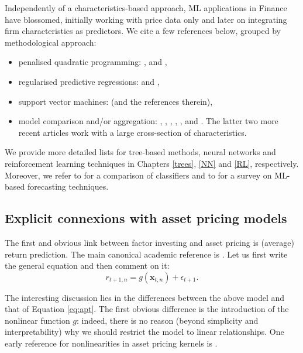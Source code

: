 \documentclass[]{krantz}
\providecommand{\tightlist}{%
  \setlength{\itemsep}{0pt}\setlength{\parskip}{0pt}}
\theoremstyle{definition}
\theoremstyle{definition}
\theoremstyle{definition}
\theoremstyle{remark}
\begin{document}
Independently of a characteristics-based approach, ML applications in
Finance have blossomed, initially working with price data only and later
on integrating firm characteristics as predictors. We cite a few
references below, grouped by methodological approach:

\begin{itemize}
\tightlist
\item
  penalised quadratic programming: \citet{goto2015improving},
  \citet{ban2016machine} and \citet{perrin2019machine},
\item
  regularised predictive regressions: \citet{rapach2013international}
  and \citet{chinco2019sparse},
\item
  support vector machines: \citet{cao2003support} (and the references
  therein),
\item
  model comparison and/or aggregation: \citet{kim2003financial},
  \citet{huang2005forecasting}, \citet{matias2012forecasting},
  \citet{reboredo2012nonlinearity}, \citet{dunis2013hybrid},
  \citet{gu2018empirical} and \citet{guida2018machine}. The latter two
  more recent articles work with a large cross-section of
  characteristics.
\end{itemize}

We provide more detailed lists for tree-based methods, neural networks
and reinforcement learning techniques in Chapters \ref{trees}, \ref{NN}
and \ref{RL}, respectively. Moreover, we refer to
\citet{ballings2015evaluating} for a comparison of classifiers and to
\citet{henrique2019literature} for a survey on ML-based forecasting
techniques.

\hypertarget{explicit-connexions-with-asset-pricing-models}{%
\subsection{Explicit connexions with asset pricing
models}\label{explicit-connexions-with-asset-pricing-models}}

The first and obvious link between factor investing and asset pricing is
(average) return prediction. The main canonical academic reference is
\citet{gu2018empirical}. Let us first write the general equation and
then comment on it: \begin{equation}
\label{eq:genML}
r_{t+1,n}=g(\textbf{x}_{t,n}) + \epsilon_{t+1}.
\end{equation}

The interesting discussion lies in the differences between the above
model and that of Equation \eqref{eq:apt}. The first obvious difference is
the introduction of the nonlinear function \(g\): indeed, there is no
reason (beyond simplicity and interpretability) why we should restrict
the model to linear relationships. One early reference for
nonlinearities in asset pricing kernels is \citet{bansal1993no}.
\end{document}
